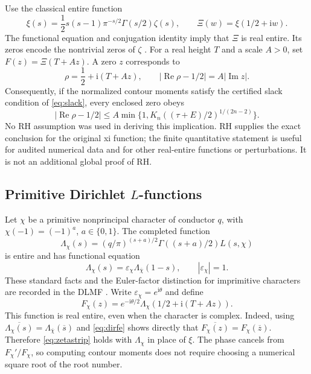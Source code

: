 \documentclass[11pt]{article}
\theoremstyle{definition}
\newcommand{\I}{\mathrm i}
\newcommand{\Repart}{\operatorname{Re}}
\newcommand{\Impart}{\operatorname{Im}}
\begin{document}
Use the classical entire function
\[
 \xi(s)=\frac12s(s-1)\pi^{-s/2}\Gamma(s/2)\zeta(s),
 \qquad \Xi(w)=\xi(1/2+\I w).
\]
The functional equation and conjugation identity imply that $\Xi$ is real
entire. Its zeros encode the nontrivial zeros of $\zeta$ \cite{dlmfzeta}.
For a real height $T$ and a scale $A>0$, set
$F(z)=\Xi(T+Az)$. A zero $z$ corresponds to
\begin{equation}
 \rho=\frac12+\I(T+Az),\qquad
 |\Repart\rho-1/2|=A|\Impart z|.
 \label{eq:coordinate}
\end{equation}
Consequently, if the normalized contour moments satisfy the certified
slack condition of \eqref{eq:slack}, every enclosed zero obeys
\begin{equation}
 \boxed{\quad
 |\Repart\rho-1/2|
 \leq A\min\{1,K_n((\tau+E)/2)^{1/(2n-2)}\}.
 \quad}
 \label{eq:zetastrip}
\end{equation}
No RH assumption was used in deriving this implication. RH supplies the
exact conclusion for the original xi function; the finite quantitative
statement is useful for audited numerical data and for other real-entire
functions or perturbations. It is not an additional global proof of RH.

\subsection{Primitive Dirichlet \texorpdfstring{$L$}{L}-functions}

Let $\chi$ be a primitive nonprincipal character of conductor $q$, with
$\chi(-1)=(-1)^a$, $a\in\{0,1\}$. The completed function
\[
 \Lambda_\chi(s)=
 (q/\pi)^{(s+a)/2}\Gamma((s+a)/2)L(s,\chi)
\]
is entire and has functional equation
\begin{equation}
 \Lambda_\chi(s)=\varepsilon_\chi\Lambda_{\overline\chi}(1-s),
 \qquad |\varepsilon_\chi|=1.
 \label{eq:dirfe}
\end{equation}
These standard facts and the Euler-factor distinction for imprimitive
characters are recorded in the DLMF \cite{dlmfdirichlet}.
Write $\varepsilon_\chi=e^{\I\theta}$ and define
\[
 F_\chi(z)=e^{-\I\theta/2}
 \Lambda_\chi(1/2+\I(T+Az)).
\]
This function is real entire, even when the character is complex. Indeed,
using $\overline{\Lambda_\chi(s)}=\Lambda_{\overline\chi}(\overline s)$
and \eqref{eq:dirfe} shows directly that
$\overline{F_\chi(z)}=F_\chi(\overline z)$.
Therefore \eqref{eq:zetastrip} holds with $\Lambda_\chi$ in place of
$\xi$. The phase cancels from $F_\chi'/F_\chi$, so computing contour
moments does not require choosing a numerical square root of the root number.
\end{document}
